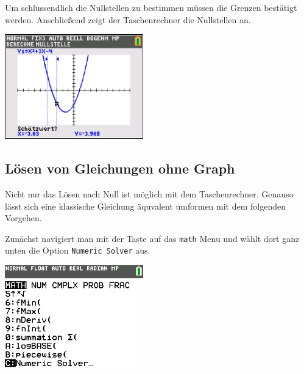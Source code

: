 \begin{paracol}{2}
	\begin{flushleft}
	Um schlussendlich die Nullstellen zu bestimmen müssen die Grenzen bestätigt werden. Anschließend zeigt der Taschenrechner die Nullstellen an.
		\end{flushleft}
\switchcolumn
	\begin{flushright}
	\includegraphics[width= 6cm]{Media/GRT/Visualisierung/loesen_gleichung/loesen_gleichung_4.png}
		\end{flushright}
		
\end{paracol}
\pagebreak

\subsection{Lösen von Gleichungen ohne Graph}\label{sec:Loesen von Gleichungen ohne Graph}
Nicht nur das Lösen nach Null ist möglich mit dem Taschenrechner. Genauso lässt sich eine klassische Gleichung äquvalent umformen mit dem folgenden Vorgehen.

\begin{paracol}{2}
	\begin{flushleft}
	Zunächst navigiert man mit der Taste  auf das \texttt{math} Menu und wählt dort ganz unten die Option \texttt{Numeric Solver} aus. 
	\end{flushleft}	
\switchcolumn
	\begin{flushright}
		\includegraphics[width=6cm]{Media/GRT/Visualisierung/Gleichung_loesen_aequivalent/Gleichung_loesen_aequivalent_1.png}
	\end{flushright}
\end{paracol}

